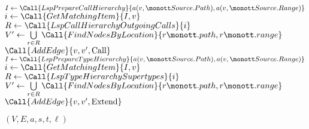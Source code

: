 \begin{algorithm}
\begin{algorithmic}[1]
		\Statex
		\State $I \gets \Call{LspPrepareCallHierarchy}{a(v, \tt{Source.Path}), a(v, \tt{Source.Range})}$
		\State $i \gets \Call{GetMatchingItem}{I, v}$
		\State $R \gets \Call{LspCallHierarchyOutgoingCalls}{i}$
		\State $V' \gets \bigcup\limits_{r \in R} \Call{FindNodesByLocation}{r\tt{.path}, r\tt{.range}}$
		\State $\Call{AddEdge}{v, v', \text{Call}}$
		\EndFor
		\State $I \gets \Call{LspPrepareTypeHierarchy}{a(v, \tt{Source.Path}), a(v, \tt{Source.Range})}$
		\State $i \gets \Call{GetMatchingItem}{I, v}$
		\State $R \gets \Call{LspTypeHierarchySupertypes}{i}$
		\State $V' \gets \bigcup\limits_{r \in R} \Call{FindNodesByLocation}{r\tt{.path}, r\tt{.range}}$
		\State $\Call{AddEdge}{v, v', \text{Extend}}$
		\EndFor
		\EndIf{}
		\EndFor
		\label{alg:generate:end2}

		\Statex
		\State {} 
		\State {}
		\State {}
		\State \Return $(V, E, a, s, t, \ell)$
		\label{alg:generate:end3}

		\Statex
	\end{algorithmic}
\end{algorithm}

